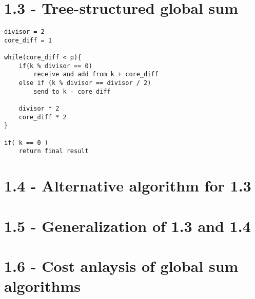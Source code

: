\documentclass[a4paper,11pt,twoside]{article}
\begin{document}
\section{1.3 - Tree-structured global sum}

\begin{verbatim}
divisor = 2
core_diff = 1

while(core_diff < p){
    if(k % divisor == 0)
        receive and add from k + core_diff
    else if (k % divisor == divisor / 2)
        send to k - core_diff

    divisor * 2
    core_diff * 2
}

if( k == 0 )
    return final result
\end{verbatim}

\section{1.4 - Alternative algorithm for 1.3}

\section{1.5 - Generalization of 1.3 and 1.4}

\section{1.6 - Cost anlaysis of global sum algorithms}



\end{document}
